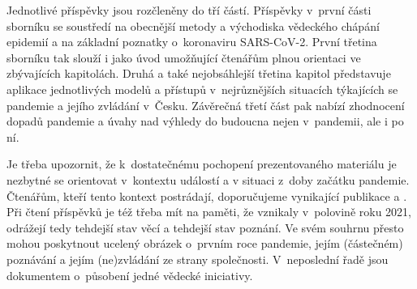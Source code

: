 Jednotlivé příspěvky jsou rozčleněny do tří částí. Příspěvky v~první části sborníku se soustředí na obecnější metody a východiska vědeckého chápání epidemií a na základní poznatky o~koronaviru SARS-CoV-2. První třetina sborníku tak slouží i jako úvod umožňující čtenářům plnou orientaci ve zbývajících kapitolách. Druhá a také nejobsáhlejší třetina kapitol představuje aplikace jednotlivých modelů a přístupů v~nejrůznějších situacích týkajících se pandemie a jejího zvládání v~Česku. Závěrečná třetí část pak nabízí zhodnocení dopadů pandemie a úvahy nad výhledy do budoucna nejen v~pandemii, ale i po ní.

 Je třeba upozornit, že k~dostatečnému pochopení prezentovaného materiálu je nezbytné se orientovat v~kontextu událostí a v situaci z~doby začátku pandemie. Čtenářům, kteří tento kontext postrádají, doporučujeme vynikající publikace \cite{kubal1} a \cite{kubal2}.
 Při čtení příspěvků je též třeba mít na paměti, že vznikaly v~polovině roku 2021, odrážejí tedy tehdejší stav věcí a tehdejší stav poznání. Ve svém souhrnu přesto mohou poskytnout ucelený obrázek o~prvním roce pandemie, jejím (částečném) poznávání a jejím (ne)zvládání ze strany společnosti. V~neposlední řadě jsou dokumentem o~působení jedné vědecké iniciativy.

